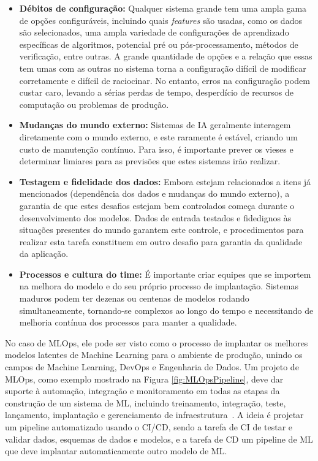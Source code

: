 \documentclass[portugues]{ic-tese}
\begin{document}
\begin{itemize}
    \item \textbf{Débitos de configuração:} Qualquer sistema grande tem uma ampla gama de opções configuráveis, incluindo quais \textit{features} são usadas, como os dados são selecionados, uma ampla variedade de configurações de aprendizado específicas de algoritmos, potencial pré ou pós-processamento, métodos de verificação, entre outras. A grande quantidade de opções e a relação que essas tem umas com as outras no sistema torna a configuração difícil de modificar corretamente e difícil de raciocinar. No entanto, erros na configuração podem custar caro, levando a sérias perdas de tempo, desperdício de recursos de computação ou problemas de produção.
    \item \textbf{Mudanças do mundo externo:} Sistemas de IA geralmente interagem diretamente com o mundo externo, e este raramente é estável, criando um custo de manutenção contínuo. Para isso, é importante prever os vieses e determinar limiares para as previsões que estes sistemas irão realizar.
    \item \textbf{Testagem e fidelidade dos dados:} Embora estejam relacionados a itens já mencionados (dependência dos dados e mudanças do mundo externo), a garantia de que estes desafios estejam bem controlados começa durante o desenvolvimento dos modelos. Dados de entrada testados e fidedignos às situações presentes do mundo garantem este controle, e procedimentos para realizar esta tarefa constituem em outro desafio para garantia da qualidade da aplicação.
    \item \textbf{Processos e cultura do time:} É importante criar equipes que se importem na melhora do modelo e do seu próprio processo de implantação. Sistemas maduros podem ter dezenas ou centenas de modelos rodando simultaneamente, tornando-se complexos ao longo do tempo e necessitando de melhoria contínua dos processos para manter a qualidade.
\end{itemize}

No caso de MLOps, ele pode ser visto como o processo de implantar os melhores modelos latentes de Machine Learning para o ambiente de produção, unindo os campos de Machine Learning, DevOps e Engenharia de Dados. Um projeto de MLOps, como exemplo mostrado na Figura \ref{fig:MLOpsPipeline}, deve dar suporte à automação, integração e monitoramento em todas as etapas da construção de um sistema de ML, incluindo treinamento, integração, teste, lançamento, implantação e gerenciamento de infraestrutura~\citep{Testi_2022}. A ideia é projetar um pipeline automatizado usando o CI/CD, sendo a tarefa de CI de testar e validar dados, esquemas de dados e modelos, e a tarefa de CD um pipeline de ML que deve implantar automaticamente outro modelo de ML.
\end{document}
